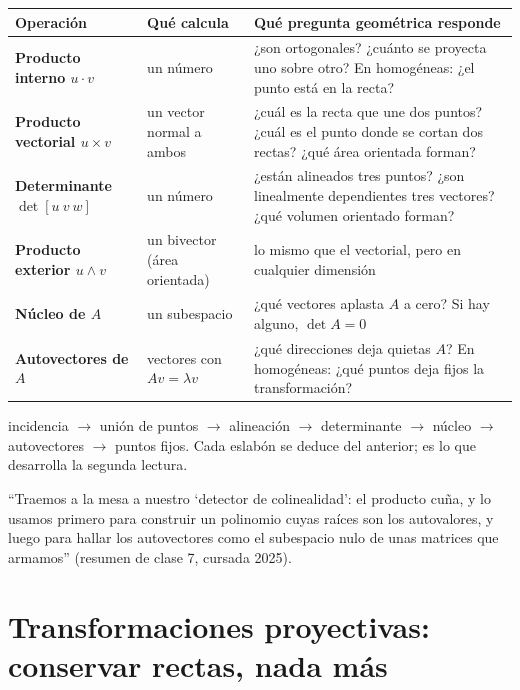 \begin{center}
\begin{tabularx}{\textwidth}{>{\bfseries}p{34mm} X X}
\toprule
Operación & Qué calcula & Qué pregunta geométrica responde\\
\midrule
Producto interno \(u\cdot v\) & un número & ¿son ortogonales? ¿cuánto se proyecta uno
sobre otro? En homogéneas: ¿el punto está en la recta?\\
Producto vectorial \(u\times v\) & un vector normal a ambos & ¿cuál es la recta que une dos
puntos? ¿cuál es el punto donde se cortan dos rectas? ¿qué área orientada forman?\\
Determinante \(\det[u\ v\ w]\) & un número & ¿están alineados tres puntos? ¿son
linealmente dependientes tres vectores? ¿qué volumen orientado forman?\\
Producto exterior \(u\wedge v\) & un bivector (área orientada) & lo mismo que el
vectorial, pero en cualquier dimensión\\
Núcleo de \(A\) & un subespacio & ¿qué vectores aplasta \(A\) a cero? Si hay alguno,
\(\det A=0\)\\
Autovectores de \(A\) & vectores con \(Av=\lambda v\) & ¿qué direcciones deja quietas
\(A\)? En homogéneas: ¿qué puntos deja fijos la transformación?\\
\bottomrule
\end{tabularx}
\end{center}

\begin{idea}[La cadena]
incidencia \(\to\) unión de puntos \(\to\) alineación \(\to\) determinante \(\to\)
núcleo \(\to\) autovectores \(\to\) puntos fijos. Cada eslabón se deduce del anterior;
es lo que desarrolla la segunda lectura.
\end{idea}

\begin{idea}
``Traemos a la mesa a nuestro `detector de colinealidad': el producto cuña, y lo usamos
primero para construir un polinomio cuyas raíces son los autovalores, y luego para hallar
los autovectores como el subespacio nulo de unas matrices que armamos'' (resumen de clase 7, cursada 2025).
\end{idea}

\section{Transformaciones proyectivas: conservar rectas, nada más}\label{sec:proyectivas-primera}

